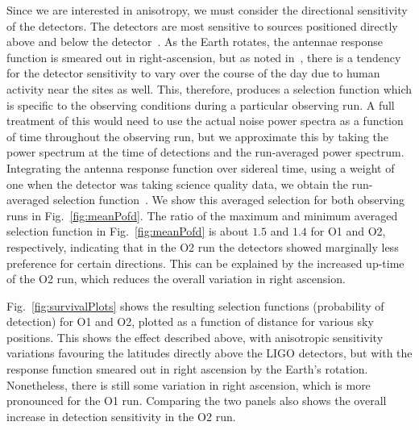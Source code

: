 \documentclass[usenatbib,useAMS]{mnras}
\begin{document}
% 
Since we are interested in anisotropy, we must consider the directional
sensitivity of the detectors. The detectors are most sensitive to sources
positioned directly above and below the detector~\citep{Anderson:2000yy}. As the
Earth rotates, the antennae response function is smeared out in right-ascension,
but as noted in~\citet{Chen:2016luc}, there is a tendency for the detector
sensitivity to vary over the course of the day due to human activity near the
sites as well. This, therefore, produces a selection function which is specific
to the observing conditions during a particular observing run.
A full treatment of this would need to use the actual noise power spectra as a
function of time throughout the observing run, but we approximate this by
taking the power spectrum at the time of detections and the run-averaged
power spectrum. Integrating the antenna response function over sidereal
time, using a weight of one when the detector was taking science quality
data, we obtain the run-averaged selection function~\citep{Vallisneri:2014vxa}.
We show this averaged selection for both
observing runs in Fig.~\ref{fig:meanPofd}. The ratio of the maximum and minimum
averaged selection function in Fig.~\ref{fig:meanPofd} is about $1.5$ and $1.4$
for O1 and O2, respectively, indicating that in the O2 run the detectors showed
marginally less preference for certain directions. This can be explained by the
increased up-time of the O2 run, which reduces the overall variation in right
ascension.

% 
Fig.~\ref{fig:survivalPlots} shows the resulting selection functions
(probability of detection) for O1 and O2, plotted as a function of distance for
various sky positions. This shows the effect described above, with anisotropic
sensitivity variations favouring the latitudes directly above the LIGO detectors,
but with the response function smeared out in right ascension by the Earth's rotation.
Nonetheless, there is still some variation in right ascension, which is more
pronounced for the O1 run. Comparing the two panels also shows the overall
increase in detection sensitivity in the O2 run.
\end{document}
